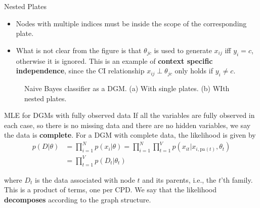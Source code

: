 \documentclass[10pt,mathserif]{beamer}
\begin{document}
\begin{frame}{Nested Plates}
\begin{itemize}
    \item  Nodes with multiple indices must be inside the scope of the corresponding plate.
    \item  What is not clear from the figure is that $\theta_{jc}$ is used to generate $x_{ij}$ iff $y_i = c$, otherwise it is ignored. This is an example of \textbf{context specific independence}, since the CI relationship $x_{ij} \perp \theta_{jc}$ only holds if $y_i\neq c$.
\end{itemize}  

\begin{figure}[h]
\centering     %
{}
\caption{Naive Bayes classifier as a DGM. (a) With single plates. (b) WIth nested plates.}
\end{figure}
\end{frame}

\begin{frame}{MLE for DGMs with fully observed data}
If all the variables are fully observed in each case, so there is no missing data and there are no hidden variables, we say the data is \textbf{complete}. For a DGM with complete data, the likelihood is given by
\begin{equation}
    \begin{split}
        p(D|\theta) & =
        \prod_{i=1}^N p(x_i|\theta)  = \prod_{i=1}^N \prod_{t=1}^V p(x_{it}|x_{i, \text{pa}(t)},\theta_t)\\
        & = \prod_{t=1}^V p(D_t|\theta_t)
    \end{split}
\end{equation}

where $D_t$ is the data associated with node $t$ and its parents, i.e., the $t$'th family. This is a product of terms, one per CPD. We say that the likelihood \textbf{decomposes} according to the graph structure.  
\end{frame}
\end{document}

